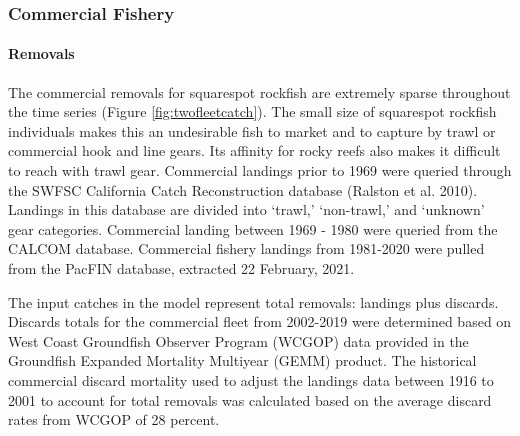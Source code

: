 \documentclass[11pt,
  english,
  a4paper,
]{article}
\begin{document}
\leavevmode\tagmcend\tagstructend\par


\hypertarget{commercial-fishery}{%
\subsubsection{Commercial Fishery}\label{commercial-fishery}}

\leavevmode\tagmcend\tagstructend


\hypertarget{removals-1}{%
\paragraph{Removals}\label{removals-1}}

\leavevmode\tagmcend\tagstructend


The commercial removals for squarespot rockfish are extremely sparse throughout the time series (Figure \ref{fig:twofleetcatch}). The small size of squarespot rockfish individuals makes this an undesirable fish to market and to capture by trawl or commercial hook and line gears. Its affinity for rocky reefs also makes it difficult to reach with trawl gear. Commercial landings prior to 1969 were queried through the SWFSC California Catch Reconstruction database {(Ralston et al. 2010)\leavevmode\tagmcend\tagstructend}. Landings in this database are divided into `trawl,' `non-trawl,' and `unknown' gear categories. Commercial landing between 1969 - 1980 were queried from the CALCOM database. Commercial fishery landings from 1981-2020 were pulled from the PacFIN database, extracted 22 February, 2021.

\leavevmode\tagmcend\tagstructend\par


The input catches in the model represent total removals: landings plus discards. Discards totals for the commercial fleet from 2002-2019 were determined based on West Coast Groundfish Observer Program (WCGOP) data provided in the Groundfish Expanded Mortality Multiyear (GEMM) product. The historical commercial discard mortality used to adjust the landings data between 1916 to 2001 to account for total removals was calculated based on the average discard rates from WCGOP of 28 percent.
\end{document}
